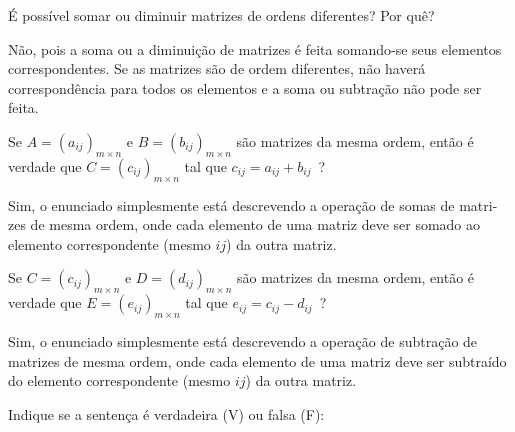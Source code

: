 \documentclass[pdftex, brazil, 12pt, oneside, addpoints]{exam}
\newcommand{\vf}[1][{}]{%
  \fillin[#1][0.25in]%
}
\begin{document}
\begin{questions}
\question
É possível somar ou diminuir matrizes de ordens diferentes? Por quê?
\begin{solutionorlines}[0.25in]
  Não, pois a soma ou a diminuição de matrizes é feita somando-se seus
  elementos correspondentes. Se as matrizes são de ordem diferentes, não
  haverá correspondência para todos os elementos e a soma ou subtração
  não pode ser feita.
\end{solutionorlines}

\question
Se $A = (a_{ij})_{m \times n}$ e $B = (b_{ij})_{m \times n}$ são matrizes
da mesma ordem, então é verdade que $C = (c_{ij})_{m \times n}$ tal que
$c_{ij} = a_{ij} + b_{ij}$\ ?
\begin{solutionorlines}[0.50in]
  Sim, o enunciado simplesmente está descrevendo a operação de somas de matri-zes
  de mesma ordem, onde cada elemento de uma matriz deve ser somado ao elemento
  correspondente (mesmo $ij$) da outra matriz.
\end{solutionorlines}

\question
Se $C = (c_{ij})_{m \times n}$ e $D = (d_{ij})_{m \times n}$ são matrizes
da mesma ordem, então é verdade que $E = (e_{ij})_{m \times n}$ tal que
$e_{ij} = c_{ij} - d_{ij}$\ ?
\begin{solutionorlines}[0.50in]
  Sim, o enunciado simplesmente está descrevendo a operação de subtração de matrizes
  de mesma ordem, onde cada elemento de uma matriz deve ser subtraído do elemento
  correspondente (mesmo $ij$) da outra matriz.
\end{solutionorlines}

\question
Indique se a sentença é verdadeira (V) ou falsa (F):
\end{questions}
\end{document}
